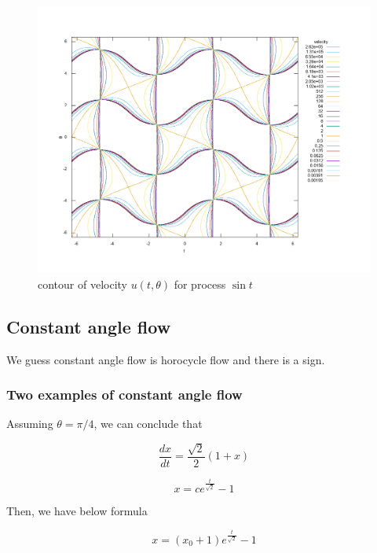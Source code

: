 \documentclass{article}
\begin{document}
\begin{figure}[ht]
\centering
\includegraphics[width=5.5in]{plot/sine2d.png}
\caption{contour of velocity $u(t, \theta)$ for process $\sin t$}
\end{figure}

\subsection{Constant angle flow}

We guess constant angle flow is horocycle flow and there is a sign.

\subsubsection{Two examples of constant angle flow}

Assuming $\theta = \pi / 4$, we can conclude that

\begin{equation}
    \frac{dx}{dt} = \frac{\sqrt{2}}{2} (1 + x)
\end{equation}

\begin{equation}
    x = c e^{\frac{t}{\sqrt{2}}} - 1
\end{equation}

Then, we have below formula

\begin{equation}
    x = (x_0 + 1)e^{\frac{t}{\sqrt{2}}} - 1
\end{equation}
\end{document}
